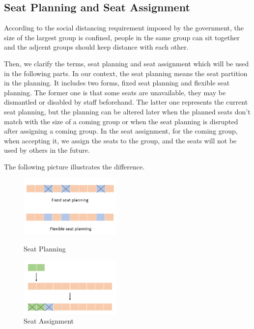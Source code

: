 \subsection{Seat Planning and Seat Assignment}
According to the social distancing requirement imposed by the government, the size of the largest group is confined, people in the same group can sit together and the adjcent groups should keep distance with each other.

Then, we clarify the terms, seat planning and seat assignment which will be used in the following parts. In our context, the seat planning means the seat partition in the planning. It includes two forms, fixed seat planning and flexible seat planning. The former one is that some seats are unavailable, they may be dismantled or disabled by staff beforehand. The latter one represents the current seat planning, but the planning can be altered later when the planned seats don't match with the size of a coming group or when the seat planning is disrupted after assigning a coming group. In the seat assignment, for the coming group, when accepting it, we assign the seats to the group, and the seats will not be used by others in the future.

The following picture illustrates the difference.

\begin{figure}[htbp]
    \centering
    \begin{minipage}[t]{0.48\textwidth}
    \centering
    \includegraphics[width=5cm]{./Figures/seat_planning.png}
    \caption{Seat Planning}
    \end{minipage}
    \begin{minipage}[t]{0.48\textwidth}
    \centering
    \includegraphics[width=5cm]{./Figures/seat_assignment.png}
    \caption{Seat Assignment}
    \end{minipage}
\end{figure}

